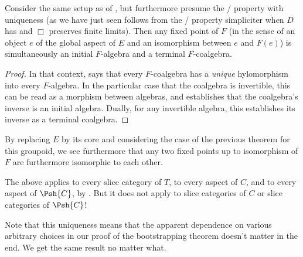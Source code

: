 \begin{corollary}\label{InitialTerminalCoincidence}
Consider the same setup as of , but furthermore presume the \Loeb/ property with uniqueness (as we have just seen follows from the \Loeb/ property simpliciter when $D$ has and $\Box$ preserves finite limits). Then any fixed point of $F$ (in the sense of an object $e$ of the global aspect of $E$ and an isomorphism between $e$ and $F(e)$) is simultaneously an initial $F$-algebra and a terminal $F$-coalgebra.
\end{corollary}
\begin{proof}
In that context,  says that every $F$-coalgebra has a \emph{unique} hylomorphism into every $F$-algebra. In the particular case that the coalgebra is invertible, this can be read as a morphism between algebras, and establishes that the coalgebra's inverse is an initial algebra. Dually, for any invertible algebra, this establishes its inverse as a terminal coalgebra.
\end{proof}

\begin{TODOblock}

By replacing $E$ by its core and considering the case of the previous theorem for this groupoid, we see furthermore that any two fixed points up to isomorphism of $F$ are furthermore isomorphic to each other. 


The above applies to every slice category of $T$, to every aspect of $C$, and to every aspect of $\Psh{C}$, by . But it does not apply to slice categories of $C$ or slice categories of $\Psh{C}$!
\end{TODOblock}

\begin{observation}
Note that this uniqueness means that the apparent dependence on various arbitrary choices in our proof of the bootstrapping theorem doesn't matter in the end. We get the same result no matter what.
\end{observation}

